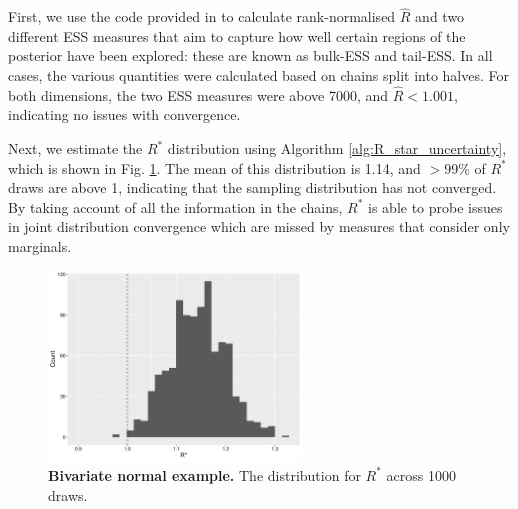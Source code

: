 \documentclass{article}
\begin{document}
First, we use the code provided in \cite{vehtari2019rank} to calculate rank-normalised $\widehat{R}$ and two different ESS measures that aim to capture how well certain regions of the posterior have been explored: these are known as bulk-ESS and tail-ESS. In all cases, the various quantities were calculated based on chains split into halves. For both dimensions, the two ESS measures were above 7000, and $\widehat{R}<1.001$, indicating no issues with convergence.

Next, we estimate the $R^*$ distribution using Algorithm \ref{alg:R_star_uncertainty}, which is shown in Fig. \ref{fig:bivariate}. The mean of this distribution is 1.14, and $>$99\% of $R^*$ draws are above 1, indicating that the sampling distribution has not converged. By taking account of all the information in the chains, $R^*$ is able to probe issues in joint distribution convergence which are missed by measures that consider only marginals.

\begin{figure}[!htb]
	\centerline{\includegraphics[width=0.6\textwidth]{../output/bivariate.pdf}}
	\caption{\textbf{Bivariate normal example.} The distribution for $R^*$ across 1000 draws.}
	\label{fig:bivariate}
\end{figure}
\end{document}
